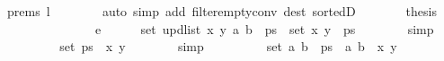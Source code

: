 \begin{isabellebody}
\ {\isachardoublequoteopen}{}{\isachardot}{\kern0pt}prems{\isachardoublequoteclose}\ l\isanewline
\ \ \ \ \ \ \isamarkupfalse%
\ {\isacharparenleft}{\kern0pt}auto\ simp\ add{\isacharcolon}{\kern0pt}\ filter{\isacharunderscore}{\kern0pt}empty{\isacharunderscore}{\kern0pt}conv\ dest{\isacharcolon}{\kern0pt}\ sorted{}D{\isacharunderscore}{\kern0pt}{}{\isacharparenright}{\kern0pt}\isanewline
\ \ \ \ \isamarkupfalse%
\ \isamarkupfalse%
\ {\isacharquery}{\kern0pt}thesis\isanewline
\ \ \ \ \ \ \isacommand{{\isachardot}{\kern0pt}}\isamarkupfalse%
\isanewline
\ \ \isamarkupfalse%
\isanewline
\ \ \ \ \isamarkupfalse%
\ e\isanewline
\ \ \ \ \isamarkupfalse%
\ {\isachardoublequoteopen}set\ {\isacharparenleft}{\kern0pt}upd{\isacharunderscore}{\kern0pt}list\ x\ y\ {\isacharparenleft}{\kern0pt}{\isacharparenleft}{\kern0pt}a{\isacharcomma}{\kern0pt}\ b{\isacharparenright}{\kern0pt}\ {\isacharhash}{\kern0pt}\ ps{\isacharparenright}{\kern0pt}{\isacharparenright}{\kern0pt}\ {\isacharequal}{\kern0pt}\ set\ {\isacharparenleft}{\kern0pt}{\isacharparenleft}{\kern0pt}x{\isacharcomma}{\kern0pt}\ y{\isacharparenright}{\kern0pt}\ {\isacharhash}{\kern0pt}\ ps{\isacharparenright}{\kern0pt}{\isachardoublequoteclose}\isanewline
\ \ \ \ \ \ \isamarkupfalse%
\ simp\isanewline
\ \ \ \ \isamarkupfalse%
\ \isamarkupfalse%
\ {\isachardoublequoteopen}{\isachardot}{\kern0pt}{\isachardot}{\kern0pt}{\isachardot}{\kern0pt}\ {\isacharequal}{\kern0pt}\ set\ ps\ {\isasymunion}\ {\isacharbraceleft}{\kern0pt}{\isacharparenleft}{\kern0pt}x{\isacharcomma}{\kern0pt}\ y{\isacharparenright}{\kern0pt}{\isacharbraceright}{\kern0pt}{\isachardoublequoteclose}\isanewline
\ \ \ \ \ \ \isamarkupfalse%
\ simp\isanewline
\ \ \ \ \isamarkupfalse%
\ \isamarkupfalse%
\ {\isachardoublequoteopen}{\isachardot}{\kern0pt}{\isachardot}{\kern0pt}{\isachardot}{\kern0pt}\ {\isacharequal}{\kern0pt}\ set\ {\isacharparenleft}{\kern0pt}{\isacharparenleft}{\kern0pt}a{\isacharcomma}{\kern0pt}\ b{\isacharparenright}{\kern0pt}\ {\isacharhash}{\kern0pt}\ ps{\isacharparenright}{\kern0pt}\ {\isacharminus}{\kern0pt}\ {\isacharbraceleft}{\kern0pt}{\isacharparenleft}{\kern0pt}a{\isacharcomma}{\kern0pt}\ b{\isacharparenright}{\kern0pt}{\isacharbraceright}{\kern0pt}\ {\isasymunion}\ {\isacharbraceleft}{\kern0pt}{\isacharparenleft}{\kern0pt}x{\isacharcomma}{\kern0pt}\ y{\isacharparenright}{\kern0pt}{\isacharbraceright}{\kern0pt}{\isachardoublequoteclose}\isanewline

\end{isabellebody}
